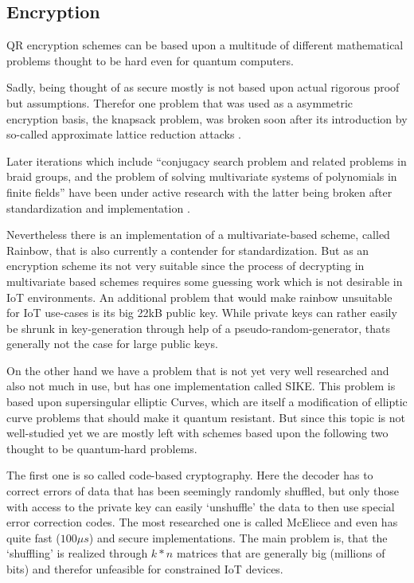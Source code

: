 \documentclass[conference]{IEEEtran}
\newcommand{\comment}[1]{}
\begin{document}
\subsection{Encryption}
\comment{ %
} %

QR encryption schemes can be based upon a multitude of different mathematical problems thought to be hard even for quantum computers.

Sadly, being thought of as secure mostly is not based upon actual rigorous proof but assumptions.
Therefor one problem that was used as a asymmetric encryption basis, the knapsack problem, was broken soon after its introduction by so-called approximate lattice reduction attacks \cite{QR_algs}.

Later iterations which include ``conjugacy search problem and related problems in braid groups, and the problem of solving
multivariate systems of polynomials in finite fields''\cite{QR_algs} have been under active research with the latter being broken after standardization and implementation \cite{QR_algs}.

Nevertheless there is an implementation of a multivariate-based scheme, called Rainbow, that is also currently a contender for standardization. But as an encryption scheme its not very suitable since the process of decrypting in multivariate based schemes requires some guessing work \cite{QR_comparison} which is not desirable in IoT environments.
An additional problem that would make rainbow unsuitable for IoT use-cases is its big 22kB public key. While private keys can rather easily be shrunk in key-generation through help of a pseudo-random-generator, thats generally not the case for large public keys.

On the other hand we have a problem that is not yet very well researched and also not much in use, but has one implementation called SIKE. This problem is based upon supersingular elliptic Curves, which are itself a modification of elliptic curve problems that should make it quantum resistant. But since this topic is not well-studied yet we are mostly left with schemes based upon the following two thought to be quantum-hard problems.

The first one is so called code-based cryptography. Here the decoder has to correct errors of data that has been seemingly randomly shuffled, but only those with access to the private key can easily `unshuffle' the data to then use special error correction codes. 
The most researched one is called McEliece and even has quite fast ($100 \mu s$) and secure implementations. 
The main problem is, that the `shuffling' is realized through $k*n$ matrices that are generally big (millions of bits) and therefor unfeasible for constrained IoT devices.
\end{document}
